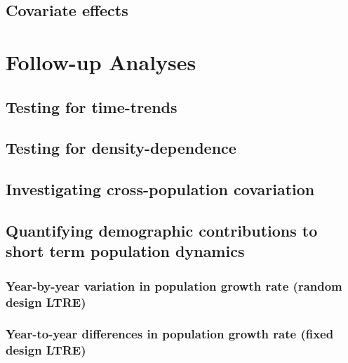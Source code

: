 \documentclass[
]{book}
\begin{document}
\hypertarget{covariate-effects}{%
\section{Covariate effects}\label{covariate-effects}}

\hypertarget{AddAnalyses}{%
\chapter{Follow-up Analyses}\label{AddAnalyses}}

\hypertarget{testing-for-time-trends}{%
\section{Testing for time-trends}\label{testing-for-time-trends}}

\hypertarget{testing-for-density-dependence}{%
\section{Testing for density-dependence}\label{testing-for-density-dependence}}

\hypertarget{investigating-cross-population-covariation}{%
\section{Investigating cross-population covariation}\label{investigating-cross-population-covariation}}

\hypertarget{quantifying-demographic-contributions-to-short-term-population-dynamics}{%
\section{Quantifying demographic contributions to short term population dynamics}\label{quantifying-demographic-contributions-to-short-term-population-dynamics}}

\hypertarget{year-by-year-variation-in-population-growth-rate-random-design-ltre}{%
\subsection{Year-by-year variation in population growth rate (random design LTRE)}\label{year-by-year-variation-in-population-growth-rate-random-design-ltre}}

\hypertarget{year-to-year-differences-in-population-growth-rate-fixed-design-ltre}{%
\subsection{Year-to-year differences in population growth rate (fixed design LTRE)}\label{year-to-year-differences-in-population-growth-rate-fixed-design-ltre}}
\end{document}
